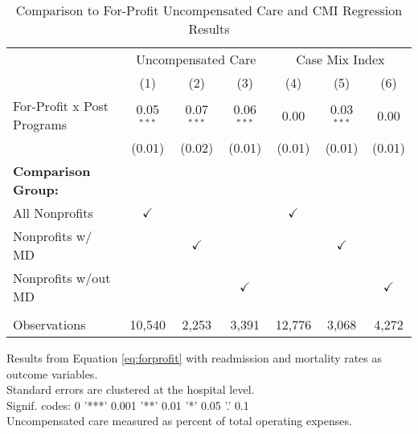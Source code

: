\begin{table}[ht!]
   \caption{\label{tab:forprofit_uncomp_CMI_fullsample} Comparison to For-Profit Uncompensated Care and CMI Regression Results}
   \bigskip
   \centering
   \begin{tabular}{lcccccc}
      \toprule
       & \multicolumn{3}{c}{Uncompensated Care} & \multicolumn{3}{c}{Case Mix Index}\\
                                  & (1)           & (2)           & (3)           & (4)           & (5)           & (6)\\  
      \midrule 
      For-Profit x Post Programs  & 0.05$^{***}$  & 0.07$^{***}$  & 0.06$^{***}$  & 0.00          & 0.03$^{***}$  & 0.00\\   
                                  & (0.01)        & (0.02)        & (0.01)        & (0.01)        & (0.01)        & (0.01)\\   
      \textbf{Comparison Group:}  &               &               &               &               &               & \\  
      All Nonprofits              & $\checkmark$  &               &               & $\checkmark$  &               & \\  
      Nonprofits w/ MD            &               & $\checkmark$  &               &               & $\checkmark$  & \\  
      Nonprofits w/out MD         &               &               & $\checkmark$  &               &               & $\checkmark$\\   
       \\
      Observations                & 10,540        & 2,253         & 3,391         & 12,776        & 3,068         & 4,272\\  
      \bottomrule
   \end{tabular}
   
   \par \raggedright 
   Results from Equation \ref{eq:forprofit} with readmission and mortality rates as outcome variables.\\
   Standard errors are clustered at the hospital level.\\
   Signif. codes: 0 '***' 0.001 '**' 0.01 '*' 0.05 '.' 0.1\\
   Uncompensated care measured as percent of total operating expenses.
\end{table}
